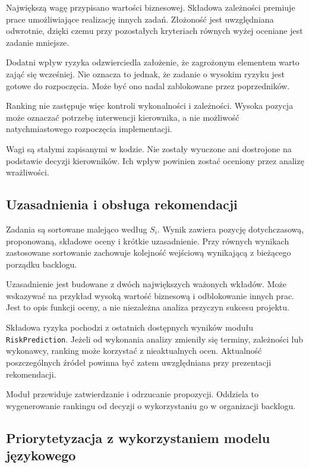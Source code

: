 Największą wagę przypisano wartości biznesowej. Składowa zależności premiuje prace umożliwiające realizację innych zadań. Złożoność jest uwzględniana odwrotnie, dzięki czemu przy pozostałych kryteriach równych wyżej oceniane jest zadanie mniejsze.

Dodatni wpływ ryzyka odzwierciedla założenie, że zagrożonym elementem warto zająć się wcześniej. Nie oznacza to jednak, że zadanie o wysokim ryzyku jest gotowe do rozpoczęcia. Może być ono nadal zablokowane przez poprzedników.

Ranking nie zastępuje więc kontroli wykonalności i zależności. Wysoka pozycja może oznaczać potrzebę interwencji kierownika, a nie możliwość natychmiastowego rozpoczęcia implementacji.

Wagi są stałymi zapisanymi w kodzie. Nie zostały wyuczone ani dostrojone na podstawie decyzji kierowników. Ich wpływ powinien zostać oceniony przez analizę wrażliwości.

\subsection{Uzasadnienia i obsługa rekomendacji}

Zadania są sortowane malejąco według \(S_i\). Wynik zawiera pozycję dotychczasową, proponowaną, składowe oceny i krótkie uzasadnienie. Przy równych wynikach zastosowane sortowanie zachowuje kolejność wejściową wynikającą z bieżącego porządku backlogu.

Uzasadnienie jest budowane z dwóch największych ważonych wkładów. Może wskazywać na przykład wysoką wartość biznesową i odblokowanie innych prac. Jest to opis funkcji oceny, a nie niezależna analiza przyczyn sukcesu projektu.

Składowa ryzyka pochodzi z ostatnich dostępnych wyników modułu \texttt{RiskPrediction}. Jeżeli od wykonania analizy zmieniły się terminy, zależności lub wykonawcy, ranking może korzystać z nieaktualnych ocen. Aktualność poszczególnych źródeł powinna być zatem uwzględniana przy prezentacji rekomendacji.

Moduł przewiduje zatwierdzanie i odrzucanie propozycji. Oddziela to wygenerowanie rankingu od decyzji o wykorzystaniu go w organizacji backlogu.

\subsection{Priorytetyzacja z wykorzystaniem modelu językowego}
\label{subsec:priorytetyzacja-llm}

